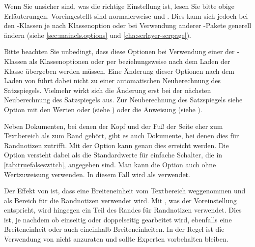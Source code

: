 Wenn Sie unsicher sind, was die richtige Einstellung ist, lesen Sie bitte
obige Erläuterungen. Voreingestellt sind normalerweise
 und
. Dies kann sich jedoch bei den
\KOMAScript-Klassen je nach Klassenoption oder bei Verwendung anderer
\KOMAScript-Pakete generell ändern (siehe \autoref{sec:maincls.options} und
\autoref{cha:scrlayer-scrpage}).

Bitte beachten Sie unbedingt, dass diese Optionen bei
Verwendung einer der \KOMAScript-Klassen als Klassenoptionen oder per
 beziehungsweise
 nach dem Laden der Klasse übergeben werden
müssen. Eine Änderung dieser Optionen nach dem Laden von 
führt dabei nicht zu einer
automatischen Neuberechnung des Satzspiegels. Vielmehr wirkt sich die Änderung
erst bei der nächsten Neuberechnung des Satzspiegels aus. Zur Neuberechnung
des Satzspiegels siehe Option
\hyperref[desc:\LabelBase.option.DIV.last]{} mit den Werten
\hyperref[desc:\LabelBase.option.DIV.last]{} oder
\hyperref[desc:\LabelBase.option.DIV.current]{} (siehe
) oder die Anweisung
 (siehe
).%
%
\EndIndexGroup


\begin{Declaration}
\end{Declaration}
Neben Dokumenten, bei denen der Kopf und der Fuß der Seite eher
zum Textbereich als zum Rand gehört, gibt es auch Dokumente, bei denen dies
für Randnotizen zutrifft. Mit der Option  kann genau dies
erreicht werden.  Die Option versteht dabei als
 die Standardwerte
für einfache Schalter, die in \autoref{tab:truefalseswitch},
 angegeben sind. Man kann die Option auch
ohne Wertzuweisung verwenden. In diesem Fall wird  als
 verwendet.

Der Effekt von
 ist,
dass eine Breiteneinheit vom Textbereich weggenommen und als Bereich für die
Randnotizen verwendet wird. Mit
, was
der Voreinstellung entspricht, wird hingegen ein Teil des Randes für
Randnotizen verwendet. Dies ist, je nachdem ob einseitig oder doppelseitig
gearbeitet wird, ebenfalls eine Breiteneinheit oder auch eineinhalb
Breiteneinheiten. In der Regel ist die Verwendung von
 nicht anzuraten und sollte Experten vorbehalten
bleiben.

